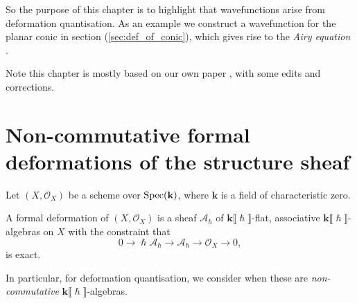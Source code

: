     So the purpose of this chapter is to highlight that wavefunctions arise from deformation quantisation. As an example we construct a wavefunction for the planar conic in section (\ref{sec:def_of_conic}), which gives rise to the \emph{Airy equation} \cite{airy}. 
    
    Note this chapter is mostly based on our own paper \cite{swaddledef}, with some edits and corrections.
    
    \section{Non-commutative formal deformations of the structure sheaf}
    Let \((X,\mathcal{O}_X)\) be a scheme over \( \mathrm{Spec}( \mathbf{k})\), where \( \mathbf{k}\) is a field of characteristic zero.  

    \begin{defn}
    A formal deformation of \((X,\mathcal{O}_X)\) is a sheaf \( \mathcal{A}_{\hslash} \) of \( \mathbf{k}\lBrack \hslash \rBrack\)-flat, associative \( \mathbf{k}\lBrack \hslash \rBrack \)-algebras on \(X\) with the constraint that \begin{equation} 
    \label{eqn:def_cons}
    0 \rightarrow \hslash \mathcal{A}_\hslash \rightarrow  \mathcal{A}_{\hslash} \rightarrow \mathcal{O}_X  \rightarrow 0,
    \end{equation}
    is exact.
    \end{defn}
    In particular, for deformation quantisation, we consider when these are \emph{non-commutative} \( \mathbf{k}\lBrack \hslash \rBrack\)-algebras.
    

